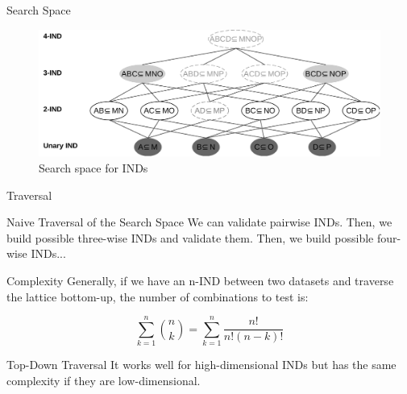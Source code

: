 \documentclass[10pt,compress]{beamer}
\begin{document}
\begin{frame}{Search Space}
\begin{figure}
    \centering
    \includegraphics[width=\textwidth]{lattice.pdf}
    \caption{Search space for INDs}
\end{figure}
\end{frame}

\begin{frame}{Traversal}
    \begin{block}{Naive Traversal of the Search Space}
        \smallskip
        We can validate pairwise INDs. Then, we build possible three-wise INDs and validate them.
        Then, we build possible four-wise INDs...
    \end{block}
        
    \begin{alertblock}{Complexity}
    \smallskip
    Generally, if we have an n-IND between two datasets and traverse the lattice bottom-up,
    the number of combinations to test is:
    
    \begin{equation*}
        \sum_{k=1}^{n}{\binom{n}{k}} = \sum_{k=1}^{n} \frac{n!}{n!(n - k)!}
    \end{equation*}
    
    \end{alertblock}

    \begin{block}{Top-Down Traversal}
        \smallskip
        It works well for high-dimensional INDs but has the same complexity if they are
        low-dimensional.
    \end{block}

\end{frame}
\end{document}
